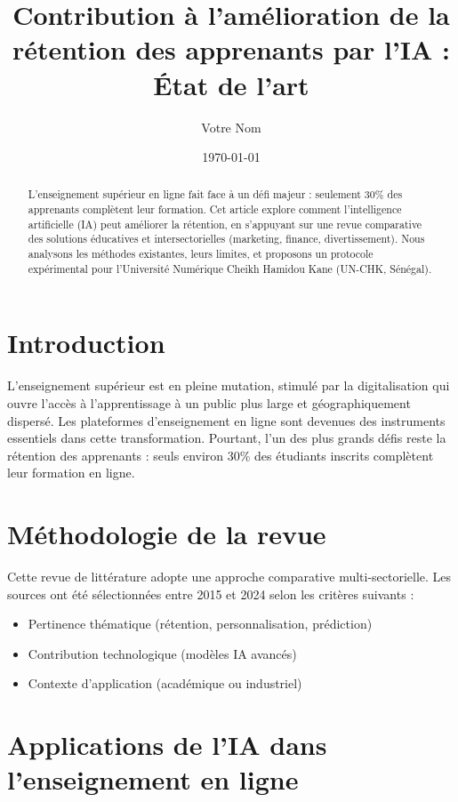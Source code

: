\documentclass[12pt, a4paper]{article}
\title{Contribution à l'amélioration de la rétention des apprenants par l'IA : État de l'art}
\author{Votre Nom}
\date{\today}
\begin{document}
	
	\maketitle
	
	\begin{abstract}
		L'enseignement supérieur en ligne fait face à un défi majeur : seulement 30\% des apprenants complètent leur formation. Cet article explore comment l'intelligence artificielle (IA) peut améliorer la rétention, en s'appuyant sur une revue comparative des solutions éducatives et intersectorielles (marketing, finance, divertissement). Nous analysons les méthodes existantes, leurs limites, et proposons un protocole expérimental pour l'Université Numérique Cheikh Hamidou Kane (UN-CHK, Sénégal).
	\end{abstract}
	
	\section{Introduction}
	\label{sec:introduction}
	
	L'enseignement supérieur est en pleine mutation, stimulé par la digitalisation qui ouvre l'accès à l'apprentissage à un public plus large et géographiquement dispersé. Les plateformes d'enseignement en ligne sont devenues des instruments essentiels dans cette transformation. Pourtant, l'un des plus grands défis reste la rétention des apprenants : seuls environ 30\% des étudiants inscrits complètent leur formation en ligne.
	
	\section{Méthodologie de la revue}
	\label{sec:methodologie}
	
	Cette revue de littérature adopte une approche comparative multi-sectorielle. Les sources ont été sélectionnées entre 2015 et 2024 selon les critères suivants :
	
	\begin{itemize}[noitemsep]
		\item Pertinence thématique (rétention, personnalisation, prédiction)
		\item Contribution technologique (modèles IA avancés)
		\item Contexte d'application (académique ou industriel)
	\end{itemize}
	
	\section{Applications de l'IA dans l'enseignement en ligne}
	\label{sec:applications}
	
\end{document}
